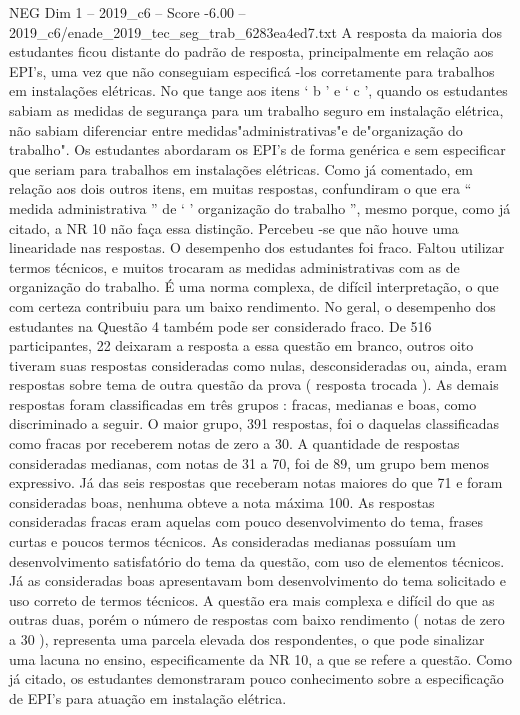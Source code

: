 \begin{textsample}{NEG Dim 1 – 2019\_c6 – Score -6.00 – 2019\_c6/enade\_2019\_tec\_seg\_trab\_6283ea4ed7.txt}
A resposta da maioria dos estudantes ficou distante do padrão de resposta, principalmente em relação aos EPI's, uma vez que não conseguiam especificá -los corretamente para trabalhos em instalações elétricas.
No que tange aos itens ‘ b ’ e ‘ c ’, quando os estudantes sabiam as medidas de segurança para um trabalho seguro em instalação elétrica, não sabiam diferenciar entre medidas"administrativas"e de"organização do trabalho".
Os estudantes abordaram os EPI’s de forma genérica e sem especificar que seriam para trabalhos em instalações elétricas.
Como já comentado, em relação aos dois outros itens, em muitas respostas, confundiram o que era “ medida administrativa ” de ‘ ’ organização do trabalho ”, mesmo porque, como já citado, a NR 10 não faça essa distinção.
Percebeu -se que não houve uma linearidade nas respostas.
O desempenho dos estudantes foi fraco.
Faltou utilizar termos técnicos, e muitos trocaram as medidas administrativas com as de organização do trabalho.
É uma norma complexa, de difícil interpretação, o que com certeza contribuiu para um baixo rendimento.
No geral, o desempenho dos estudantes na Questão 4 também pode ser considerado fraco.
De 516 participantes, 22 deixaram a resposta a essa questão em branco, outros oito tiveram suas respostas consideradas como nulas, desconsideradas ou, ainda, eram respostas sobre tema de outra questão da prova ( resposta trocada ).
As demais respostas foram classificadas em três grupos : fracas, medianas e boas, como discriminado a seguir.
O maior grupo, 391 respostas, foi o daquelas classificadas como fracas por receberem notas de zero a 30.
A quantidade de respostas consideradas medianas, com notas de 31 a 70, foi de 89, um grupo bem menos expressivo.
Já das seis respostas que receberam notas maiores do que 71 e foram consideradas boas, nenhuma obteve a nota máxima 100.
As respostas consideradas fracas eram aquelas com pouco desenvolvimento do tema, frases curtas e poucos termos técnicos.
As consideradas medianas possuíam um desenvolvimento satisfatório do tema da questão, com uso de elementos técnicos.
Já as consideradas boas apresentavam bom desenvolvimento do tema solicitado e uso correto de termos técnicos.
A questão era mais complexa e difícil do que as outras duas, porém o número de respostas com baixo rendimento ( notas de zero a 30 ), representa uma parcela elevada dos respondentes, o que pode sinalizar uma lacuna no ensino, especificamente da NR 10, a que se refere a questão.
Como já citado, os estudantes demonstraram pouco conhecimento sobre a especificação de EPI’s para atuação em instalação elétrica.

\end{textsample}
